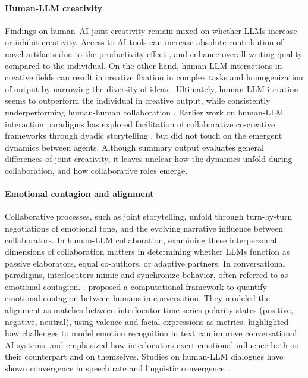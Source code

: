 \documentclass[11pt]{article}
\begin{document}
\paragraph{Human-LLM creativity}
Findings on human--AI joint creativity remain mixed on whether LLMs increase or inhibit creativity. Access to AI tools can increase absolute contribution of novel artifacts due to the productivity effect \cite{zhou2025expands}, and enhance overall writing quality \cite{noy2023experimental} compared to the individual. On the other hand, human-LLM interactions in creative fields can result in creative fixation in complex tasks \cite{cheng2025inspiration} and homogenization of output by narrowing the diversity of ideas \cite{anderson2024homogenization}. Ultimately, human-LLM iteration seems to outperform the individual in creative output, while consistently underperforming human-human collaboration \cite{tang2025best}. Earlier work on human-LLM interaction paradigms has explored facilitation of collaborative co-creative frameworks through dyadic storytelling \cite{roemmele2015creative, clark2021choose}, but did not touch on the emergent dynamics between agents. Although summary output evaluates general differences of joint creativity, it leaves unclear how the dynamics unfold during collaboration, and how collaborative roles emerge. 

\paragraph{Emotional contagion and alignment}
Collaborative processes, such as joint storytelling, unfold through turn-by-turn negotiations of emotional tone, and the evolving narrative influence between collaborators. In human-LLM collaboration, examining these interpersonal dimensions of collaboration matters in determining whether LLMs function as passive elaborators, equal co-authors, or adaptive partners. In conversational paradigms, interlocutors mimic and synchronize behavior, often referred to as emotional contagion. \cite{hatfield1993emotional}. \citet{varni2017computational} proposed a computational framework to quantify emotional contagion between humans in conversation. They modeled the alignment as matches between interlocutor time series polarity states (positive, negative, neutral), using valence and facial expressions as metrics. \citet{poria2019emotion} highlighted how challenges to model emotion recognition in text can improve conversational AI-systems, and emphasized how interlocutors exert emotional influence both on their counterpart and on themselves. Studies on human-LLM dialogues have shown convergence in speech rate \cite{li2025ai} and linguistic convergence \cite{wilkenfeld2022ai}.  
\end{document}
